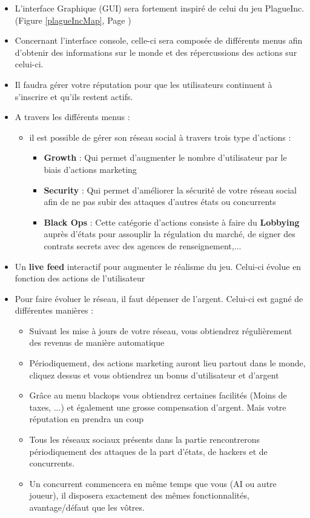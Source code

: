 \begin{itemize}
    \item L'interface Graphique (GUI) sera fortement inspiré de celui du jeu PlagueInc. (Figure \ref{plagueIncMap}, Page \pageref{plagueIncMap})
    \item Concernant l'interface console, celle-ci sera composée de différents menus afin d'obtenir des informations sur le monde et des répercussions des actions sur celui-ci.
    
    \item Il faudra gérer votre réputation pour que les utilisateurs continuent à s'inscrire et qu'ils restent actifs.
    
    \item A travers les différents menus :
    
    \begin{itemize}
        \item il est possible de gérer son réseau social à travers trois type d'actions :
    
        \begin{itemize}
            \item \textbf{Growth} : Qui permet d'augmenter le nombre d'utilisateur par le biais d'actions marketing
            \item \textbf{Security} : Qui permet d'améliorer la sécurité de votre réseau social afin de ne pas subir des attaques d'autres états ou concurrents
            \item \textbf{Black Ops} : Cette catégorie d'actions consiste à faire du \textbf{Lobbying} auprès d'états pour assouplir la régulation du marché, de signer des contrats secrets avec des agences de renseignement,...
        \end{itemize}
        \end{itemize}
        \item{Un \textbf{live feed} interactif pour augmenter le réalisme du jeu. Celui-ci évolue en fonction des actions de l'utilisateur}
        \item Pour faire évoluer le réseau, il faut dépenser de l'argent. Celui-ci est gagné de différentes manières : 
        \begin{itemize}
            \item Suivant les mise à jours de votre réseau, vous obtiendrez régulièrement des revenus de manière automatique
            \item Périodiquement, des actions marketing auront lieu partout dans le monde, cliquez dessus et vous obtiendrez un bonus d'utilisateur et d'argent
            \item Grâce au menu blackops vous obtiendrez certaines facilités (Moins de taxes, ...) et également une grosse compensation d'argent. Mais votre réputation en prendra un coup
        \item Tous les réseaux sociaux présents dans la partie rencontrerons périodiquement des attaques de la part d'états, de hackers et de concurrents.
        \item Un concurrent commencera en même temps que vous (AI ou autre joueur), il disposera exactement des mêmes fonctionnalités, avantage/défaut que les vôtres.
    \end{itemize}
    

\end{itemize}

